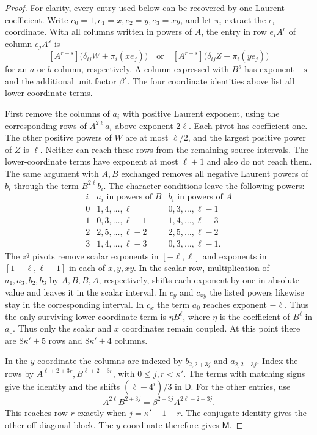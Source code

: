 \documentclass[11pt,a4paper,reqno]{amsart}
\numberwithin{equation}{section}
\theoremstyle{plain}
\theoremstyle{definition}
\theoremstyle{remark}
\begin{document}
\begin{proof}
For clarity, every entry used below can be recovered by one Laurent
coefficient. Write $e_0=1,e_1=x,e_2=y,e_3=xy$, and let
$\pi_i$ extract the $e_i$ coordinate. With all columns written in
powers of $A$, the entry in row $e_iA^r$ of column $e_jA^s$ is
\[
 [A^{r-s}]\bigl(\delta_{ij}W+\pi_i(xe_j)\bigr)
 \quad\text{or}\quad
 [A^{r-s}]\bigl(\delta_{ij}Z+\pi_i(ye_j)\bigr)
\]
for an $a$ or $b$ column, respectively. A column expressed with $B^s$
has exponent $-s$ and the additional unit factor $\beta^s$.
The four coordinate identities above list all lower-coordinate terms.

First remove the columns of $a_i$ with positive Laurent exponent, using
the corresponding rows of $A^{2\ell}a_i$ above exponent $2\ell$.
Each pivot has coefficient one. The other positive powers of $W$ are at
most $\ell/2$, and the largest positive power of $Z$ is $\ell$. Neither
can reach these rows from the remaining source intervals. The
lower-coordinate terms have exponent at most $\ell+1$ and also do not
reach them. The same argument with $A,B$ exchanged removes all negative
Laurent powers of $b_i$ through the term $B^{2\ell}b_i$.
The character conditions leave the following powers:
\[
\begin{array}{c|c|c}
i&a_i\text{ in powers of }B&b_i\text{ in powers of }A\\\hline
0&1,4,\ldots,\ell&0,3,\ldots,\ell-1\\
1&0,3,\ldots,\ell-1&1,4,\ldots,\ell-3\\
2&2,5,\ldots,\ell-2&2,5,\ldots,\ell-2\\
3&1,4,\ldots,\ell-3&0,3,\ldots,\ell-1.
\end{array}
\]
The $z^q$ pivots remove scalar exponents in $[-\ell,\ell]$
and exponents in $[1-\ell,\ell-1]$ in each of $x,y,xy$.
In the scalar row, multiplication of $a_1,a_3,b_2,b_3$ by
$A,B,B,A$, respectively, shifts each exponent by one in absolute
value and leaves it in the scalar interval. In $c_y$ and $c_{xy}$
the listed powers likewise stay in the corresponding interval.
In $c_x$ the term $a_0$ reaches exponent $-\ell$.
Thus the only surviving lower-coordinate term is
$\eta B^\ell$, where $\eta$ is the coefficient of $B^\ell$ in $a_0$.
Thus only the scalar and $x$ coordinates remain coupled. At this point
there are $8\kappa'+5$ rows and $8\kappa'+4$ columns.

In the $y$ coordinate the columns are indexed by $b_{2,2+3j}$ and $a_{2,2+3j}$. Index the rows by
$A^{\ell+2+3r},B^{\ell+2+3r}$, with $0\leq j,r<\kappa'$.
The terms with matching signs give the identity and the shifts
$(\ell-4^i)/3$ in $\mathsf D$. For the other entries, use
\[
A^{2\ell}B^{2+3j}
 =\beta^{2+3j}A^{2\ell-2-3j}.
\]
This reaches row $r$ exactly when $j=\kappa'-1-r$.
The conjugate identity gives the other off-diagonal block. The $y$
coordinate therefore gives $\mathsf M$.


\end{proof}
\end{document}
